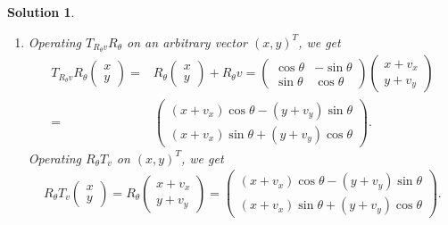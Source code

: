 \documentclass[UTF8,10pt,a4paper]{article}
\theoremstyle{Problem}
\theoremstyle{Solution}
\newtheorem*{sol}{Solution}
\begin{document}
\begin{sol}
\begin{enumerate}
\begin{align}
\begin{matrix}
            \end{matrix}\right)=R_{-\psi}.
        \end{align}
        \item[(c)] Operating $T_{R_{\theta}v}R_{\theta}$ on an arbitrary vector $(x,y)^T$, we get
        \begin{align}
            \nonumber T_{R_{\theta}v}R_{\theta}\left(\begin{matrix}
                x\\
                y
            \end{matrix}\right)=&R_{\theta}\left(\begin{matrix}
                x\\
                y
            \end{matrix}\right)+R_{\theta}v=\left(\begin{matrix}
                \cos\theta&-\sin\theta\\
                \sin\theta&\cos\theta
            \end{matrix}\right)\left(\begin{matrix}
                x+v_x\\
                y+v_y
            \end{matrix}\right)\\
            \nonumber=&\left(\begin{matrix}
                (x+v_x)\cos\theta-(y+v_y)\sin\theta\\
                (x+v_x)\sin\theta+(y+v_y)\cos\theta
            \end{matrix}\right).
        \end{align}
        Operating $R_{\theta}T_v$ on $(x,y)^T$, we get
        \begin{align}
            R_{\theta}T_v\left(\begin{matrix}
                x\\
                y
            \end{matrix}\right)=R_{\theta}\left(\begin{matrix}
                x+v_x\\
                y+v_y
            \end{matrix}\right)=\left(\begin{matrix}
                (x+v_x)\cos\theta-(y+v_y)\sin\theta\\
                (x+v_x)\sin\theta+(y+v_y)\cos\theta
            \end{matrix}\right).
        \end{align}

\end{enumerate}
\end{sol}
\end{document}
